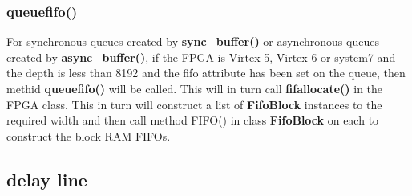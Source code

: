     \subsubsection{queuefifo()}
    
        For synchronous queues created by {\bf sync\_buffer()} or asynchronous
        queues created by {\bf async\_buffer()}, if the FPGA is Virtex 5, Virtex 6
        or system7 and the depth is less than 8192 and the fifo attribute has been
        set on the queue, then methid {\bf queuefifo()} will be called. This will in
        turn call {\bf fifallocate()} in the FPGA class. This in turn will
        construct a list of {\bf FifoBlock} instances to the required width and
        then call method FIFO() in class {\bf FifoBlock} on each to construct the
        block RAM FIFOs.



\subsection{delay line}

